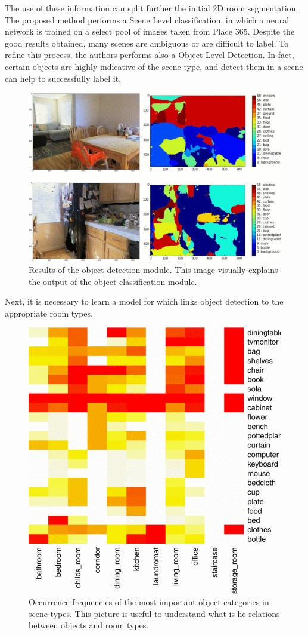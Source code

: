 The use of these information can split further the initial 2D room segmentation. The proposed method performs a Scene Level classification, in which a neural network is trained on a select pool of images taken from Place 365. Despite the good results obtained, many scenes are ambiguous or are difficult to label. To refine this process, the authors performs also a Object Level Detection. In fact, certain objects are highly indicative of the scene type, and detect them in a scene can help to successfully label it.

\begin{figure}[h!]
	\centering
	\includegraphics[width=0.7\linewidth]{images/object_dete.png}
	\caption{Results of the object detection module. This image visually explains the output of the object classification module.}
\end{figure}

Next, it is necessary to learn a model for which links object detection to the appropriate room types.

\begin{figure}[h!]
	\centering
	\includegraphics[width=0.5\linewidth]{images/obkject_in_rooms.png}
	\caption{Occurrence frequencies of the most important object categories in scene types. This picture is useful to understand what is he relations between objects and room types.}
\end{figure}

